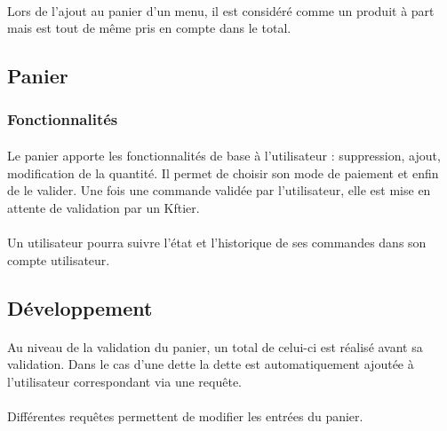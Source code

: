 \documentclass[twoside,UTF8]{EPURapport}
\begin{document}
                \paragraph{}Lors de l'ajout au panier d'un menu, il est considéré comme un produit à part mais est tout de même pris en compte dans le total.            

        \subsection{Panier}

            \subsubsection{Fonctionnalités}
                
                \paragraph{}Le panier apporte les fonctionnalités de base à l'utilisateur : suppression, ajout, modification de la quantité. Il permet de choisir son mode de paiement et enfin de le valider. Une fois une commande validée par l'utilisateur, elle est mise en attente de validation par un Kftier.

                \paragraph{}Un utilisateur pourra suivre l'état et l'historique de ses commandes dans son compte utilisateur.

            \subsection{Développement}

                \paragraph{}Au niveau de la validation du panier, un total de celui-ci est réalisé avant sa validation. Dans le cas d'une dette la dette est automatiquement ajoutée à l'utilisateur correspondant via une requête.

                \paragraph{}Différentes requêtes permettent de modifier les entrées du panier.
\end{document}
